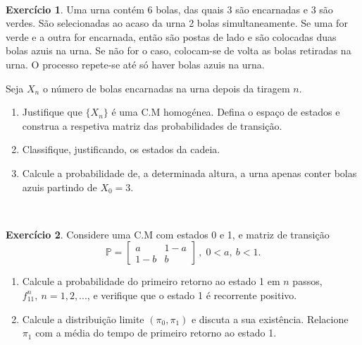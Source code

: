 \documentclass[
  11pt,
  a4paper,
]{book}
\theoremstyle{definition}
\theoremstyle{definition}
\theoremstyle{definition}
\newtheorem{exercise}{Exercício}[chapter]
\theoremstyle{definition}
\theoremstyle{remark}
\begin{document}
\(\,\)

\begin{exercise}
\leavevmode

Uma urna contém 6 bolas, das quais 3 são encarnadas e 3 são verdes. São selecionadas ao acaso da urna 2 bolas simultaneamente. Se uma for verde e a outra for encarnada, então são postas de lado e são colocadas duas bolas azuis na urna. Se não for o caso, colocam-se de volta as bolas retiradas na urna. O processo repete-se até só haver bolas azuis na urna.

Seja \(X_{n}\) o número de bolas encarnadas na urna depois da tiragem \(n\).

\begin{enumerate}
\def\labelenumi{(\alph{enumi})}
\item
  Justifique que \(\{X_{n}\}\) é uma C.M homogénea. Defina o espaço de estados e construa a respetiva matriz das probabilidades de transição.
\item
  Classifique, justificando, os estados da cadeia.
\item
  Calcule a probabilidade de, a determinada altura, a urna apenas conter bolas azuis partindo de \(X_{0}=3\).
\end{enumerate}

\end{exercise}

\(\,\)

\begin{exercise}
\leavevmode

Considere uma C.M com estados 0 e 1, e matriz de transição
\[
\mathbb{P}=\left[
\begin{array}{cc}
a & 1-a \\
1-b & b%
\end{array}
\right] \, , \; 0<a,~ b<1.
\]

\begin{enumerate}
\def\labelenumi{(\alph{enumi})}
\item
  Calcule a probabilidade do primeiro retorno ao estado 1 em \(n\) passos,
  \(f_{11}^{n}, ~n=1,2,...\), e verifique que o estado 1 é recorrente
  positivo.
\item
  Calcule a distribuição limite \((\pi _{0},\pi _{1})\) e discuta a
  sua existência. Relacione \(\pi _{1}\) com a média do tempo de
  primeiro retorno ao estado 1.
\end{enumerate}

\end{exercise}

\(\,\)
\end{document}
